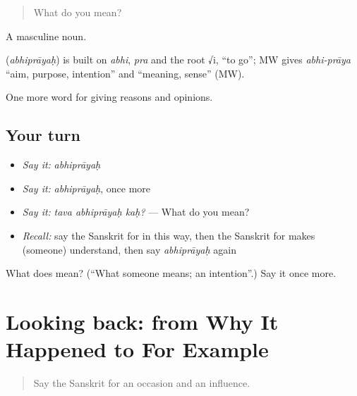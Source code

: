 \begin{quote}
What do you mean?
\end{quote}

A masculine noun.

\begin{cousinweb}
\textbf{} (\emph{abhiprāyaḥ}) is built on \emph{abhi}, \emph{pra} and the root √i, \textquotedblleft{}to go\textquotedblright{}; MW gives \emph{abhi-prāya} \textquotedblleft{}aim, purpose, intention\textquotedblright{} and \textquotedblleft{}meaning, sense\textquotedblright{} (MW).
\end{cousinweb}

\begin{grammarlens}[title={What you've built}]
One more word for giving reasons and opinions.
\end{grammarlens}

\subsection*{Your turn}
\begin{itemize}
\raggedright
  \item \emph{Say it:} \emph{abhiprāyaḥ}
  \item \emph{Say it:} \emph{abhiprāyaḥ}, once more
  \item \emph{Say it:} \emph{tava abhiprāyaḥ kaḥ?} — What do you mean?
  \item \emph{Recall:} say the Sanskrit for in this way, then the Sanskrit for makes (someone) understand, then say \emph{abhiprāyaḥ} again
\end{itemize}

\begin{tcolorbox}[breakable,colback=teal!4,colframe=teal!35!black,title={Before you move on}]
What does  mean? (\textquotedblleft{}What someone means; an intention\textquotedblright{}.) Say it once more.
\end{tcolorbox}
\section[(dialogue)]{Looking back: from Why It Happened to For Example}

\label{lesson:SA-R347-review-340-347}



\begin{quote}
Say the Sanskrit for an occasion and an influence.
\end{quote}


